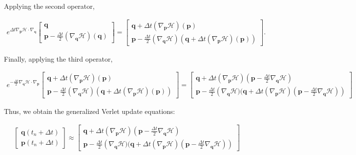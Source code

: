 \documentclass[draft]{agujournal2019}
\begin{document}
\begin{definition}
Applying the second operator,

\begin{align*}
    e^{\Delta t\nabla_\mathbf{p} \mathcal{H} \cdot \nabla_\mathbf{q}}
    \begin{bmatrix} \mathbf{q} \\ \mathbf{p} - \frac{\Delta t}{2} \left(\nabla_\mathbf{q} \mathcal{H}\right) \left(\mathbf{q}\right) \end{bmatrix} =
    \begin{bmatrix} \mathbf{q} + \Delta t \left(\nabla_\mathbf{p} \mathcal{H}\right)\left(\mathbf{p}\right) \\ \mathbf{p} - \frac{\Delta t}{2}  (\nabla_\mathbf{q} \mathcal{H})(\mathbf{q} + \Delta t \left(\nabla_\mathbf{p} \mathcal{H}\right)\left(\mathbf{p}\right)) \end{bmatrix}.
\end{align*}

Finally, applying the third operator,

\begin{align*}
    e^{- \frac{\Delta t}{2} \nabla_\mathbf{q} \mathcal{H} \cdot \nabla_\mathbf{p}}
    \begin{bmatrix} \mathbf{q} + \Delta t \left(\nabla_\mathbf{p} \mathcal{H}\right)\left(\mathbf{p}\right) \\ \mathbf{p} - \frac{\Delta t}{2}  (\nabla_\mathbf{q} \mathcal{H})(\mathbf{q} + \Delta t \left(\nabla_\mathbf{p} \mathcal{H}\right)\left(\mathbf{p}\right)) \end{bmatrix} =
    \begin{bmatrix} \mathbf{q} + \Delta t\left(\nabla_\mathbf{p} \mathcal{H}\right)\left(\mathbf{p} - \frac{\Delta t}{2} \nabla_\mathbf{q} \mathcal{H} \right) \\ \mathbf{p} - \frac{\Delta t}{2}  \left(\nabla_\mathbf{q} \mathcal{H})(\mathbf{q} + \Delta t \left(\nabla_\mathbf{p} \mathcal{H}\right)\left(\mathbf{p} - \frac{\Delta t}{2} \nabla_\mathbf{q} \mathcal{H}\right) \right) \end{bmatrix}
\end{align*}

Thus, we obtain the generalized Verlet update equations:

\begin{align*}
    \begin{bmatrix} \mathbf{q}(t_n + \Delta t) \\ \mathbf{p}(t_n + \Delta t) \end{bmatrix} \approx
    \begin{bmatrix} \mathbf{q} + \Delta t\left(\nabla_\mathbf{p} \mathcal{H}\right)\left(\mathbf{p} - \frac{\Delta t}{2} \nabla_\mathbf{q} \mathcal{H} \right) \\ \mathbf{p} - \frac{\Delta t}{2}  \left(\nabla_\mathbf{q} \mathcal{H})(\mathbf{q} + \Delta t \left(\nabla_\mathbf{p} \mathcal{H}\right)\left(\mathbf{p} - \frac{\Delta t}{2} \nabla_\mathbf{q} \mathcal{H}\right) \right) \end{bmatrix}
\end{align*}


\end{definition}
\end{document}
